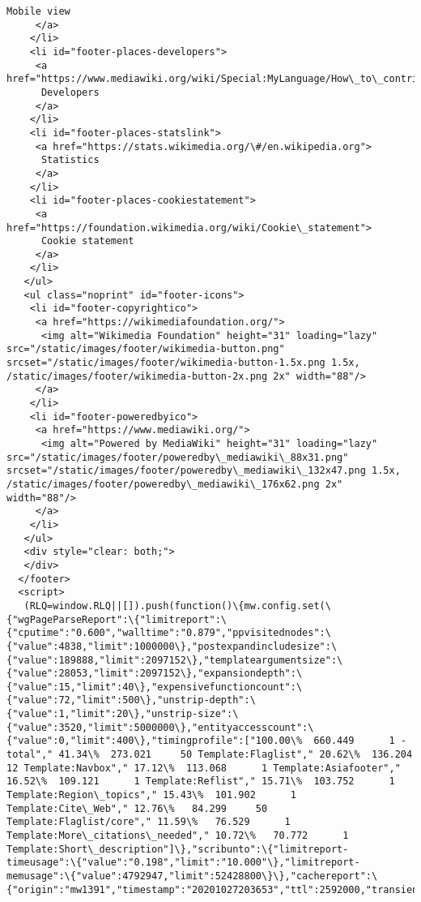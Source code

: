 \documentclass[11pt]{article}
\begin{document}
\begin{Verbatim}[commandchars=\\\{\}]
      Mobile view
     </a>
    </li>
    <li id="footer-places-developers">
     <a href="https://www.mediawiki.org/wiki/Special:MyLanguage/How\_to\_contribute">
      Developers
     </a>
    </li>
    <li id="footer-places-statslink">
     <a href="https://stats.wikimedia.org/\#/en.wikipedia.org">
      Statistics
     </a>
    </li>
    <li id="footer-places-cookiestatement">
     <a href="https://foundation.wikimedia.org/wiki/Cookie\_statement">
      Cookie statement
     </a>
    </li>
   </ul>
   <ul class="noprint" id="footer-icons">
    <li id="footer-copyrightico">
     <a href="https://wikimediafoundation.org/">
      <img alt="Wikimedia Foundation" height="31" loading="lazy" src="/static/images/footer/wikimedia-button.png" srcset="/static/images/footer/wikimedia-button-1.5x.png 1.5x, /static/images/footer/wikimedia-button-2x.png 2x" width="88"/>
     </a>
    </li>
    <li id="footer-poweredbyico">
     <a href="https://www.mediawiki.org/">
      <img alt="Powered by MediaWiki" height="31" loading="lazy" src="/static/images/footer/poweredby\_mediawiki\_88x31.png" srcset="/static/images/footer/poweredby\_mediawiki\_132x47.png 1.5x, /static/images/footer/poweredby\_mediawiki\_176x62.png 2x" width="88"/>
     </a>
    </li>
   </ul>
   <div style="clear: both;">
   </div>
  </footer>
  <script>
   (RLQ=window.RLQ||[]).push(function()\{mw.config.set(\{"wgPageParseReport":\{"limitreport":\{"cputime":"0.600","walltime":"0.879","ppvisitednodes":\{"value":4838,"limit":1000000\},"postexpandincludesize":\{"value":189888,"limit":2097152\},"templateargumentsize":\{"value":28053,"limit":2097152\},"expansiondepth":\{"value":15,"limit":40\},"expensivefunctioncount":\{"value":72,"limit":500\},"unstrip-depth":\{"value":1,"limit":20\},"unstrip-size":\{"value":3520,"limit":5000000\},"entityaccesscount":\{"value":0,"limit":400\},"timingprofile":["100.00\%  660.449      1 -total"," 41.34\%  273.021     50 Template:Flaglist"," 20.62\%  136.204     12 Template:Navbox"," 17.12\%  113.068      1 Template:Asiafooter"," 16.52\%  109.121      1 Template:Reflist"," 15.71\%  103.752      1 Template:Region\_topics"," 15.43\%  101.902      1 Template:Cite\_Web"," 12.76\%   84.299     50 Template:Flaglist/core"," 11.59\%   76.529      1 Template:More\_citations\_needed"," 10.72\%   70.772      1 Template:Short\_description"]\},"scribunto":\{"limitreport-timeusage":\{"value":"0.198","limit":"10.000"\},"limitreport-memusage":\{"value":4792947,"limit":52428800\}\},"cachereport":\{"origin":"mw1391","timestamp":"20201027203653","ttl":2592000,"transientcontent":false\}\}\});\});

\end{Verbatim}
\end{document}
